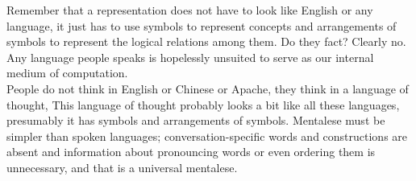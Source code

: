 \documentclass[13pt,letterpaper,onecolumn]{report}
\begin{document}
\hspace{1em}Remember that a representation does not have to look like English or any language, it just has to use symbols to represent concepts and arrangements of symbols to represent the logical relations among them. Do they fact? Clearly no. Any language people speaks is hopelessly unsuited to serve as our internal medium of computation.\\ People do not think in English or Chinese or Apache, they think in a language of thought, This language of thought probably looks a bit like all these languages, presumably it has symbols and arrangements of symbols. Mentalese must be simpler than spoken languages; conversation-specific words and constructions are absent and information about pronouncing words or even ordering them is unnecessary, and that is a universal mentalese.
\end{document}
